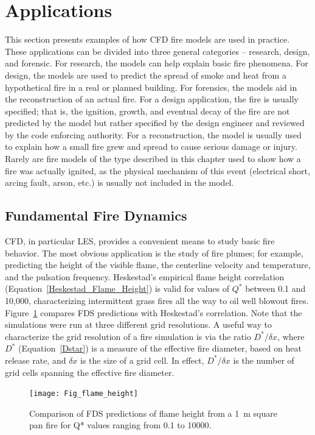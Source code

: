 \documentclass[graybox]{svmult}
\begin{document}
\section{Applications}

This section presents examples of how CFD fire models are used in practice. These applications can be divided into three general categories -- research, design, and forensic. For research, the models can help explain basic fire phenomena. For design, the models are used to predict the spread of smoke and heat from a hypothetical fire in a real or planned building. For forensics, the models aid in the reconstruction of an actual fire. For a design application, the fire is usually specified; that is, the ignition, growth, and eventual decay of the fire are not predicted by the model but rather specified by the design engineer and reviewed by the code enforcing authority. For a reconstruction, the model is usually used to explain how a small fire grew and spread to cause serious damage or injury. Rarely are fire models of the type described in this chapter used to show how a fire was actually ignited, as the physical mechanism of this event (electrical short, arcing fault, arson, etc.) is usually not included in the model.

\subsection{Fundamental Fire Dynamics}

CFD, in particular LES, provides a convenient means to study basic fire behavior. The most obvious application is the study of fire plumes; for example, predicting the height of the visible flame, the centerline velocity and temperature, and the pulsation frequency. Heskestad's empirical flame height correlation (Equation~\ref{Heskestad_Flame_Height}) is valid for values of  $Q^*$ between 0.1 and 10,000, characterizing intermittent grass fires all the way to oil well blowout fires. Figure~\ref{Flame_Height} compares FDS predictions with Heskestad's correlation. Note that the simulations were run at three different grid resolutions. A useful way to characterize the grid resolution of a fire simulation is via the ratio $D^*/\delta x$, where $D^*$ (Equation~\ref{Dstar}) is a measure of the effective fire diameter, based on heat release rate, and $\delta x$ is the size of a grid cell. In effect, $D^*/\delta x$ is the number of grid cells spanning the effective fire diameter.
\begin{figure}[ht]
\begin{center}
\texttt{[image: Fig\_flame\_height]}
\end{center}
\caption{Comparison of FDS predictions of flame height from a 1~m square pan fire for Q* values ranging from
0.1 to 10000.}
\label{Flame_Height}
\end{figure}
\end{document}
